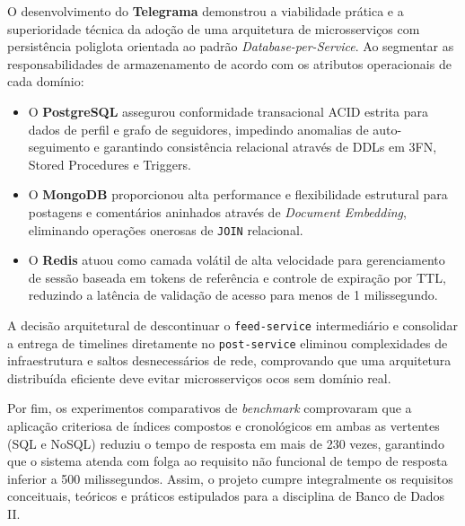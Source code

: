 \documentclass[12pt,a4paper]{report}
\begin{document}
O desenvolvimento do \textbf{Telegrama} demonstrou a viabilidade prática e a superioridade técnica da adoção de uma arquitetura de microsserviços com persistência poliglota orientada ao padrão \textit{Database-per-Service}. Ao segmentar as responsabilidades de armazenamento de acordo com os atributos operacionais de cada domínio:
\begin{itemize}
    \item O \textbf{PostgreSQL} assegurou conformidade transacional ACID estrita para dados de perfil e grafo de seguidores, impedindo anomalias de auto-seguimento e garantindo consistência relacional através de DDLs em 3FN, Stored Procedures e Triggers.
    \item O \textbf{MongoDB} proporcionou alta performance e flexibilidade estrutural para postagens e comentários aninhados através de \textit{Document Embedding}, eliminando operações onerosas de \texttt{JOIN} relacional.
    \item O \textbf{Redis} atuou como camada volátil de alta velocidade para gerenciamento de sessão baseada em tokens de referência e controle de expiração por TTL, reduzindo a latência de validação de acesso para menos de 1 milissegundo.
\end{itemize}

A decisão arquitetural de descontinuar o \texttt{feed-service} intermediário e consolidar a entrega de timelines diretamente no \texttt{post-service} eliminou complexidades de infraestrutura e saltos desnecessários de rede, comprovando que uma arquitetura distribuída eficiente deve evitar microsserviços ocos sem domínio real.

Por fim, os experimentos comparativos de \textit{benchmark} comprovaram que a aplicação criteriosa de índices compostos e cronológicos em ambas as vertentes (SQL e NoSQL) reduziu o tempo de resposta em mais de 230 vezes, garantindo que o sistema atenda com folga ao requisito não funcional de tempo de resposta inferior a 500 milissegundos. Assim, o projeto cumpre integralmente os requisitos conceituais, teóricos e práticos estipulados para a disciplina de Banco de Dados II.
\end{document}

